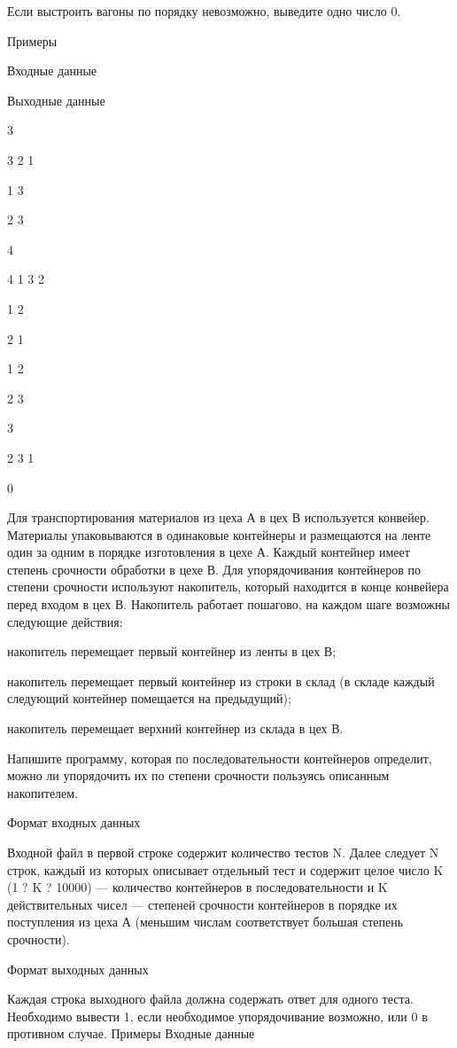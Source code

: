 \documentclass[]{article}
\begin{document}
Если выстроить вагоны по порядку невозможно, выведите одно число 0.

Примеры

Входные данные
	

Выходные данные

3

3 2 1
	

1 3

2 3

4

4 1 3 2
	

1 2

2 1

1 2

2 3

3

2 3 1
	

0

Для транспортирования материалов из цеха А в цех В используется конвейер. Материалы упаковываются в одинаковые контейнеры и размещаются на ленте один за одним в порядке изготовления в цехе А. Каждый контейнер имеет степень срочности обработки в цехе В. Для упорядочивания контейнеров по степени срочности используют накопитель, который находится в конце конвейера перед входом в цех В. Накопитель работает пошагово, на каждом шаге возможны следующие действия:

накопитель перемещает первый контейнер из ленты в цех В;

накопитель перемещает первый контейнер из строки в склад (в складе каждый следующий контейнер помещается на предыдущий);

накопитель перемещает верхний контейнер из склада в цех В.

Напишите программу, которая по последовательности контейнеров определит, можно ли упорядочить их по степени срочности пользуясь описанным накопителем.

Формат входных данных

Входной файл в первой строке содержит количество тестов N. Далее следует N строк, каждый из которых описывает отдельный тест и содержит целое число K (1 ? K ? 10000) — количество контейнеров в последовательности и K действительных чисел — степеней срочности контейнеров в порядке их поступления из цеха А (меньшим числам соответствует большая степень срочности).

Формат выходных данных

Каждая строка выходного файла должна содержать ответ для одного теста. Необходимо вывести 1, если необходимое упорядочивание возможно, или 0 в противном случае.
Примеры
Входные данные
\end{document}
